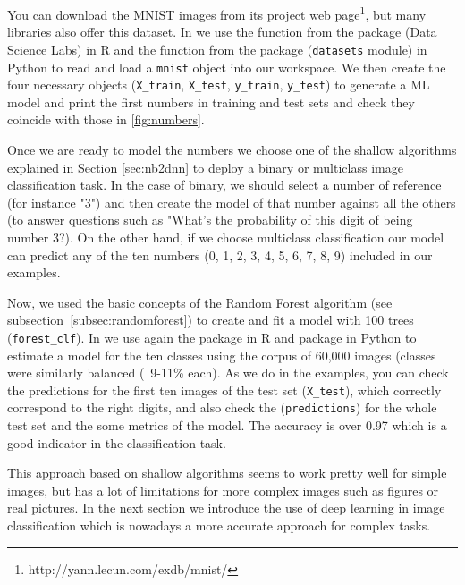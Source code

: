 You can download the MNIST images from its project web page\footnote{http://yann.lecun.com/exdb/mnist/}, but many libraries also offer this dataset. In  we use the  function from the  package (Data Science Labs) in R and the  function from the  package (\texttt{datasets} module) in Python to read and load a \texttt{mnist} object into our workspace. We then create the four necessary objects (\texttt{X\_train}, \texttt{X\_test}, \texttt{y\_train}, \texttt{y\_test}) to generate a ML model and print the first numbers in training and test sets and check they coincide with those in \ref{fig:numbers}.


Once we are ready to model the numbers we choose one of the shallow algorithms explained in Section \ref{sec:nb2dnn} to deploy a binary or multiclass image classification task. In the case of binary, we should select a number of reference (for instance "3") and then create the model of that number against all the others (to answer questions such as "What's the probability of this digit of being number 3?). On the other hand, if we choose multiclass classification our model can predict any of the ten numbers (0, 1, 2, 3, 4, 5, 6, 7, 8, 9) included in our examples.

Now, we used the basic concepts of the Random Forest algorithm (see subsection~\ref{subsec:randomforest}) to create and fit a model with 100 trees (\texttt{forest\_clf}). In  we use again the  package in R and  package in Python to estimate a model for the ten classes using the corpus of 60,000 images (classes were similarly balanced (~9-11\% each). As we do in the examples, you can check the predictions for the first ten images of the test set (\texttt{X\_test}), which correctly correspond to the right digits, and also check the (\texttt{predictions}) for the whole test set and the some metrics of the model. The accuracy is over 0.97 which is a good indicator in the classification task.


This approach based on shallow algorithms seems to work pretty well for simple images, but has a lot of limitations for more complex images such as figures or real pictures. In the next section we introduce the use of deep learning in image classification which is nowadays a more accurate approach for complex tasks.


